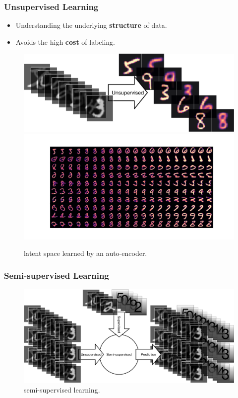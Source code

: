 \documentclass[10pt, usenames, dvipsnames, table]{beamer}
\begin{document}
\begin{frame}
  \frametitle{Unsupervised Learning}
  \begin{itemize}
  \item Understanding the underlying \textbf{structure} of data.
    \pause{}
  \item Avoids the high \textbf{cost} of labeling.
  \end{itemize}
  \pause{}
  \begin{figure}
    \centering
    \includegraphics[align=c, width=0.4\linewidth]{docs/unsupervised}
    \includegraphics[align=c, width=0.55\linewidth]{docs/visualize_decoding}
    \caption{latent space learned by an auto-encoder.}
    \label{fig:unsupervised}
  \end{figure}
\end{frame}

\begin{frame}
  \frametitle{Semi-supervised Learning}
  \begin{figure}
    \centering
    \includegraphics[width=\linewidth]{docs/semi_supervised}
    \caption{semi-supervised learning.}
    \label{fig:semi-supervised}
  \end{figure}
\end{frame}
\end{document}
